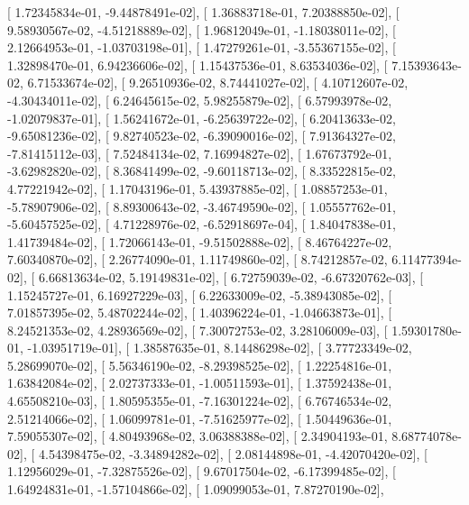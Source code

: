 \documentclass{article}
\begin{document}
       [  1.72345834e-01,  -9.44878491e-02],
       [  1.36883718e-01,   7.20388850e-02],
       [  9.58930567e-02,  -4.51218889e-02],
       [  1.96812049e-01,  -1.18038011e-02],
       [  2.12664953e-01,  -1.03703198e-01],
       [  1.47279261e-01,  -3.55367155e-02],
       [  1.32898470e-01,   6.94236606e-02],
       [  1.15437536e-01,   8.63534036e-02],
       [  7.15393643e-02,   6.71533674e-02],
       [  9.26510936e-02,   8.74441027e-02],
       [  4.10712607e-02,  -4.30434011e-02],
       [  6.24645615e-02,   5.98255879e-02],
       [  6.57993978e-02,  -1.02079837e-01],
       [  1.56241672e-01,  -6.25639722e-02],
       [  6.20413633e-02,  -9.65081236e-02],
       [  9.82740523e-02,  -6.39090016e-02],
       [  7.91364327e-02,  -7.81415112e-03],
       [  7.52484134e-02,   7.16994827e-02],
       [  1.67673792e-01,  -3.62982820e-02],
       [  8.36841499e-02,  -9.60118713e-02],
       [  8.33522815e-02,   4.77221942e-02],
       [  1.17043196e-01,   5.43937885e-02],
       [  1.08857253e-01,  -5.78907906e-02],
       [  8.89300643e-02,  -3.46749590e-02],
       [  1.05557762e-01,  -5.60457525e-02],
       [  4.71228976e-02,  -6.52918697e-04],
       [  1.84047838e-01,   1.41739484e-02],
       [  1.72066143e-01,  -9.51502888e-02],
       [  8.46764227e-02,   7.60340870e-02],
       [  2.26774090e-01,   1.11749860e-02],
       [  8.74212857e-02,   6.11477394e-02],
       [  6.66813634e-02,   5.19149831e-02],
       [  6.72759039e-02,  -6.67320762e-03],
       [  1.15245727e-01,   6.16927229e-03],
       [  6.22633009e-02,  -5.38943085e-02],
       [  7.01857395e-02,   5.48702244e-02],
       [  1.40396224e-01,  -1.04663873e-01],
       [  8.24521353e-02,   4.28936569e-02],
       [  7.30072753e-02,   3.28106009e-03],
       [  1.59301780e-01,  -1.03951719e-01],
       [  1.38587635e-01,   8.14486298e-02],
       [  3.77723349e-02,   5.28699070e-02],
       [  5.56346190e-02,  -8.29398525e-02],
       [  1.22254816e-01,   1.63842084e-02],
       [  2.02737333e-01,  -1.00511593e-01],
       [  1.37592438e-01,   4.65508210e-03],
       [  1.80595355e-01,  -7.16301224e-02],
       [  6.76746534e-02,   2.51214066e-02],
       [  1.06099781e-01,  -7.51625977e-02],
       [  1.50449636e-01,   7.59055307e-02],
       [  4.80493968e-02,   3.06388388e-02],
       [  2.34904193e-01,   8.68774078e-02],
       [  4.54398475e-02,  -3.34894282e-02],
       [  2.08144898e-01,  -4.42070420e-02],
       [  1.12956029e-01,  -7.32875526e-02],
       [  9.67017504e-02,  -6.17399485e-02],
       [  1.64924831e-01,  -1.57104866e-02],
       [  1.09099053e-01,   7.87270190e-02],
\end{document}

